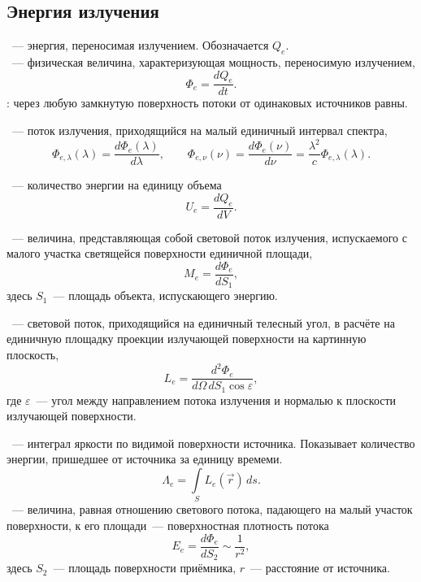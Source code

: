\subsection{Энергия излучения}
~--- энергия, переносимая излучением. Обозначается $Q_e$.\\
~--- физическая величина, характеризующая мощность, переносимую излучением,
\begin{equation}
 \Phi_e = \frac{d Q_e}{dt}.
\end{equation}
: через любую замкнутую поверхность потоки от одинаковых источников равны.

~--- поток излучения, приходящийся на малый единичный интервал спектра,
\begin{equation}
\Phi_{e, \lambda}(\lambda) = \frac{d\Phi_e(\lambda)}{d\lambda}, \quad\quad \Phi_{e, \nu}(\nu) = \frac{d\Phi_e(\nu)}{d\nu} =  \frac{\lambda^2}{c}\Phi_{e, \lambda}(\lambda).
\end{equation}

~--- количество энергии на единицу объема
\begin{equation}
U_e = \frac{d Q_e}{dV}.
\end{equation}

~--- величина, представляющая собой световой поток излучения, испускаемого с малого участка светящейся поверхности единичной площади,
\begin{equation}
M_e = \frac{d \Phi_e}{dS_1},
\end{equation}
здесь $S_1$~--- площадь объекта, испускающего энергию.

~--- световой поток, приходящийся на единичный телесный угол, в расчёте на единичную площадку проекции излучающей поверхности на картинную плоскость, 
\begin{equation}
L_e = \frac{d^2 \Phi_e}{d \Omega\,dS_1 \cos \varepsilon},
\end{equation}
где $\varepsilon$~--- угол между направлением потока излучения и нормалью к плоскости излучающей поверхности.

~--- интеграл яркости по видимой поверхности источника. Показывает количество энергии, пришедшее от источника за единицу времеми.
\begin{equation}
\Lambda_e = \int \limits_S L_e(\vec{r})\,ds.
\end{equation}
~--- величина, равная отношению светового потока, падающего на малый участок поверхности, к его площади~--- поверхностная плотность потока
\begin{equation}
E_e = \frac{d\Phi_e}{dS_2} \sim \frac{1}{r^2},
\end{equation}
здесь $S_2$~--- площадь поверхности приёмника, $r$~--- расстояние от источника.